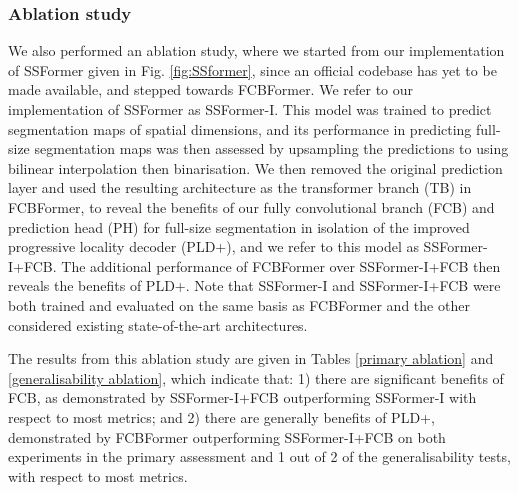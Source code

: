 \documentclass[runningheads]{llncs}
\begin{document}
\subsubsection{Ablation study}
We also performed an ablation study, where we started from our implementation of SSFormer given in Fig. \ref{fig:SSformer}, since an official codebase has yet to be made available, and stepped towards FCBFormer. We refer to our implementation of SSFormer as SSFormer-I. This model was trained to predict segmentation maps of  spatial dimensions, and its performance in predicting full-size segmentation maps was then assessed by upsampling the predictions to  using bilinear interpolation then binarisation. We then removed the original prediction layer and used the resulting architecture as the transformer branch (TB) in FCBFormer, to reveal the benefits of our fully convolutional branch (FCB) and prediction head (PH) for full-size segmentation in isolation of the improved progressive locality decoder (PLD+), and we refer to this model as SSFormer-I+FCB. The additional performance of FCBFormer over SSFormer-I+FCB then reveals the benefits of PLD+. Note that SSFormer-I and SSFormer-I+FCB were both trained and evaluated on the same basis as FCBFormer and the other considered existing state-of-the-art architectures.

The results from this ablation study are given in Tables \ref{primary ablation} and \ref{generalisability ablation}, which indicate that: 1) there are significant benefits of FCB, as demonstrated by SSFormer-I+FCB outperforming SSFormer-I with respect to most metrics; and 2) there are generally benefits of PLD+, demonstrated by FCBFormer outperforming SSFormer-I+FCB on both experiments in the primary assessment and 1 out of 2 of the generalisability tests, with respect to most metrics.
\end{document}
